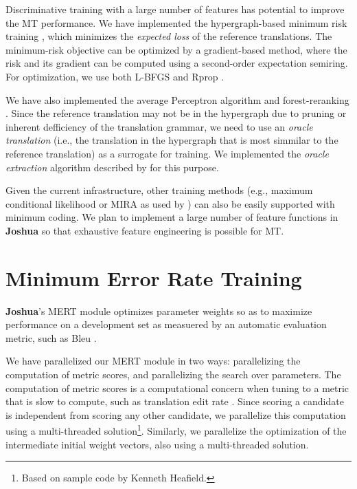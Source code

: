 \documentclass[11pt]{article}
\newcommand{\joshua}{\textbf{Joshua}\xspace}
\begin{document}
Discriminative training with a large number of features has potential
to improve the MT performance.  We have implemented the
hypergraph-based minimum risk training \cite{li-eisner:2009:EMNLP},
which minimizes the {\em expected loss} of the reference translations.
The minimum-risk objective can be optimized by a gradient-based
method, where the risk and its gradient can be computed using a
second-order expectation semiring.  For optimization, we use both
L-BFGS \cite{lbfgs} and Rprop \cite{rprop}.

We have also implemented the average Perceptron algorithm and forest-reranking \cite{zhifei-forest-reranking-galebook}.
Since the reference translation may not be in the hypergraph due to pruning or inherent
defficiency of the translation grammar, we need to use an {\em oracle translation} (i.e., the translation in
the hypergraph that is most simmilar to the reference translation) as a surrogate for training.
We implemented the {\em oracle extraction} algorithm described by 
for this purpose.

Given the current infrastructure, other training methods 
(e.g., maximum conditional likelihood or MIRA as used by )
can also be easily supported with minimum coding.
We plan to implement a large number of feature functions in \joshua so that exhaustive 
feature engineering is possible for MT.


\section{Minimum Error Rate Training}

\joshua's MERT module optimizes parameter weights so as to maximize performance
on a development set as measuered by an automatic evaluation metric, such as
Bleu \cite{och-mert}.

We have parallelized our MERT module in two ways: parallelizing the computation
of metric scores, and parallelizing the search over parameters. The computation
of metric scores is a computational concern when tuning to a metric that is
slow to compute, such as translation edit rate \cite{snover-etal:2006:ter}.
Since scoring a candidate is independent from scoring any other candidate, we
parallelize this computation using a multi-threaded solution\footnote{Based on
sample code by Kenneth Heafield.}. Similarly, we parallelize the optimization
of the intermediate initial weight vectors, also using a multi-threaded
solution.
\end{document}

